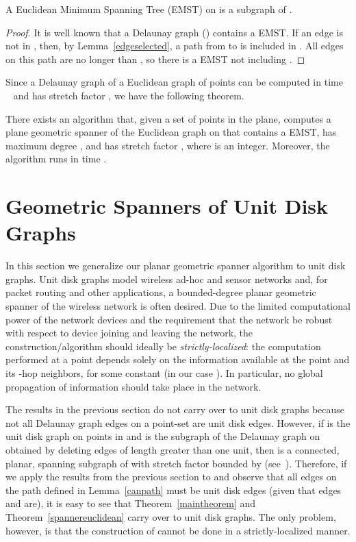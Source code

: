 \documentclass{stacs_proc}
\theoremstyle{plain}\newtheorem{satz}[thm]{Satz}
\begin{document}
\begin{corollary}
A Euclidean Minimum Spanning Tree (EMST) on  is a subgraph of . 
\begin{proof}
It is well known that a Delaunay graph () contains a EMST. If an edge 
is not in , then, by Lemma~\ref{edgeselected}, a path from  to  is
included in . All edges on this path are no longer than , so there is
a EMST not including . 
\end{proof}
\end{corollary}
Since a Delaunay graph of a Euclidean graph of  points can be
computed in time ~\cite{book} and has stretch factor
, we have the following theorem.
\begin{theorem}
\label{spannereuclidean} There exists an algorithm that, given a
set  of  points in the plane, computes a plane geometric spanner
of the Euclidean graph on  that contains a EMST, has maximum degree ,
and has stretch factor
, where 
is an integer. Moreover, the algorithm runs in time .
\end{theorem}


\section{Geometric Spanners of Unit Disk Graphs}
  \label{structresults}  In this section we generalize our planar geometric
spanner algorithm to unit disk graphs. Unit disk graphs model wireless ad-hoc
and sensor networks and, for packet routing and other applications, a
bounded-degree planar geometric spanner of the wireless network is often
desired. Due to the limited computational power of the network devices and
the requirement that the network be robust with respect to device joining
and leaving the network, the construction/algorithm should ideally be
{\em strictly-localized}: the computation performed at a point depends solely
on the information available at the point and its -hop neighbors, for some
constant  (in our case ). In particular, no global propagation of
information should take place in the network.

The results in the previous section do not carry over to unit disk graphs
because not all Delaunay graph edges on a point-set  are
unit disk edges. However, if  is the unit disk graph on points in  and
 is the subgraph of the Delaunay graph on  obtained by deleting
edges of length greater than one unit, then  is a connected,
planar, spanning subgraph of  with stretch factor bounded by 
(see~\cite{iitunbounded1, BoseMNSZ04}). Therefore, if we apply the results
from the previous section to
 and observe that all edges on the path defined in
Lemma~\ref{canpath} must be unit disk edges (given that edges 
and  are), it is easy to see that Theorem~\ref{maintheorem} and
Theorem~\ref{spannereuclidean} carry over to unit disk graphs. The
only problem, however, is that the construction of  cannot
be done in a strictly-localized manner.
\end{document}
